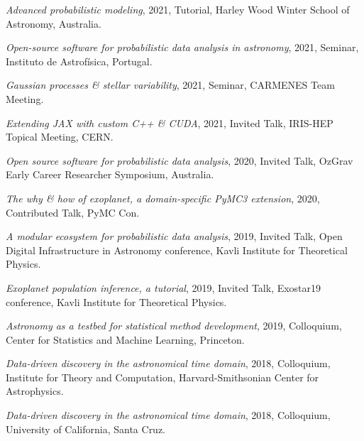 \documentclass[12pt,letterpaper]{article}
\begin{document}
\begin{list}{}{\cvlist}

  \item \emph{Advanced probabilistic modeling},
      2021, Tutorial, Harley Wood Winter School of Astronomy, Australia.

  \item \emph{Open-source software for probabilistic data analysis in astronomy},
      2021, Seminar, Instituto de Astrof\'isica, Portugal.

  \item \emph{Gaussian processes \& stellar variability},
      2021, Seminar, CARMENES Team Meeting.

  \item \emph{Extending JAX with custom C++ \& CUDA},
        2021, Invited Talk, IRIS-HEP Topical Meeting, CERN.

  \item \emph{Open source software for probabilistic data analysis},
        2020, Invited Talk, OzGrav Early Career Researcher Symposium, Australia.

  \item \emph{The why \& how of exoplanet, a domain-specific PyMC3 extension},
        2020, Contributed Talk, PyMC Con.

  \item \emph{A modular ecosystem for probabilistic data analysis},
        2019, Invited Talk, Open Digital Infrastructure in Astronomy conference,
        Kavli Institute for Theoretical Physics.

  \item \emph{Exoplanet population inference, a tutorial},
        2019, Invited Talk, Exostar19 conference,
        Kavli Institute for Theoretical Physics.

  \item \emph{Astronomy as a testbed for statistical method development},
        2019, Colloquium, Center for Statistics and Machine Learning,
        Princeton.

  \item \emph{Data-driven discovery in the astronomical time domain},
        2018, Colloquium, Institute for Theory and Computation,
        Harvard-Smithsonian Center for Astrophysics.

  \item \emph{Data-driven discovery in the astronomical time domain},
        2018, Colloquium, University of California, Santa Cruz.


\end{list}
\end{document}
